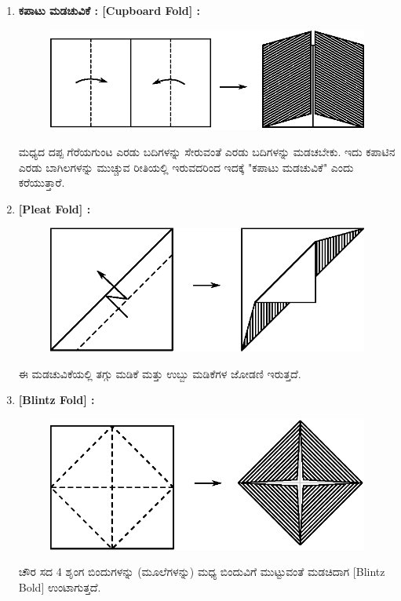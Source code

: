 \begin{enumerate}
\item  \textbf{ಕಪಾಟು ಮಡಚುವಿಕೆ : [Cupboard Fold] :} 
\begin{figure}[H]
\centering
\includegraphics[scale=.98]{src/figure/chap1/fig1-4.eps}
\end{figure}


ಮಧ್ಯದ ದಪ್ಪ ಗೆರೆಯಗುಂಟ ಎರಡು ಬದಿಗಳನ್ನು ಸೇರುವಂತೆ ಎರಡು ಬದಿಗಳನ್ನು ಮಡಚಬೇಕು. ಇದು ಕಪಾಟಿನ ಎರಡು ಬಾಗಿಲಗಳನ್ನು ಮುಚ್ಚುವ ರೀತಿಯಲ್ಲಿ ಇರುವದರಿಂದ ಇದಕ್ಕೆ "ಕಪಾಟು ಮಡಚುವಿಕೆ" ಎಂದು ಕರೆಯುತ್ತಾರೆ. 

\item  \textbf{[Pleat Fold] :}
\begin{figure}[H]
\centering
\includegraphics[scale=.98]{src/figure/chap1/fig1-5.eps}
\end{figure}


ಈ ಮಡಚುವಿಕೆಯಲ್ಲಿ ತಗ್ಗು ಮಡಿಕೆ ಮತ್ತು ಉಬ್ಬು ಮಡಿಕೆಗಳ ಜೋಡಣಿ ಇರುತ್ತದೆ. 

\item  \textbf{[Blintz Fold] :}
\begin{figure}[H]
\centering
\includegraphics[scale=.98]{src/figure/chap1/fig1-6.eps}
\end{figure}


ಚೌರ ಸದ 4  ಶೃಂಗ ಬಿಂದುಗಳನ್ನು (ಮೂಲೆಗಳನ್ನು) ಮಧ್ಯ ಬಿಂದುವಿಗೆ ಮುಟ್ಟು\break ವಂತೆ ಮಡಚಿದಾಗ [Blintz Bold] ಉಂಟಾಗುತ್ತದೆ. 
 \end{enumerate}

